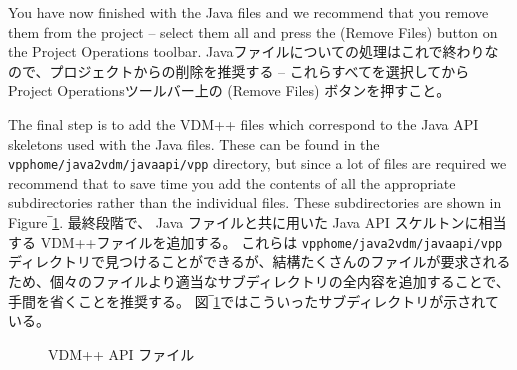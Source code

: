 \documentclass[\pformat,12pt]{jarticle}
\newcommand{\vdmhome}{vpphome}
\newcommand{\guicmd}[1]{{\sf #1}}
\begin{document}
You have now finished with the Java files and we recommend that you
remove them from the project -- select them all and press the 
(\guicmd{Remove Files}) button on the \guicmd{Project Operations}
toolbar.
 Javaファイルについての処理はこれで終わりなので、プロジェクトからの削除を推奨する -- これらすべてを選択してから \guicmd{Project Operations}ツールバー上の (\guicmd{Remove Files}) ボタンを押すこと。

The final step is to add the VDM++ files which correspond to the Java
API skeletons used with the Java files. These can be found in the {\tt
  \vdmhome/java2vdm/javaapi/vpp} directory, but since a lot of files are
required we recommend that to save time you add the contents of all
the appropriate subdirectories rather than the individual files. These
subdirectories are shown in Figure‾\ref{fig:vdmApiFiles}. 
最終段階で、 Java ファイルと共に用いた Java API スケルトンに相当する VDM++ファイルを追加する。 
これらは {\tt \vdmhome/java2vdm/javaapi/vpp} ディレクトリで見つけることができるが、結構たくさんのファイルが要求されるため、個々のファイルより適当なサブディレクトリの全内容を追加することで、手間を省くことを推奨する。
 図‾\ref{fig:vdmApiFiles}ではこういったサブディレクトリが示されている。

\begin{figure}[tbh]
\begin{center}
\caption{VDM++ API ファイル}\label{fig:vdmApiFiles}
\end{center}
\end{figure}
\end{document}
